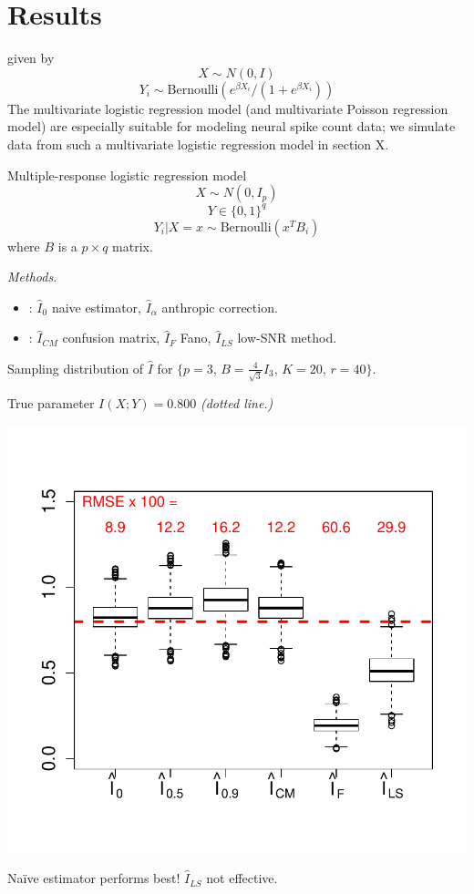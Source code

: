 \documentclass{article}
\begin{document}
\section{Results}

given by
\[
X \sim N(0, I)
\]
\[
Y_i \sim \text{Bernoulli}(e^{\beta X_i}/(1 + e^{\beta X_i}))
\]
The multivariate logistic regression model (and multivariate Poisson regression model)
are especially suitable for modeling neural spike count data;
we simulate data from such a multivariate logistic regression model in section X.


Multiple-response logistic regression model
\[
X \sim N(0, I_p)
\]
\[
Y \in \{0,1\}^q
\]
\[
Y_i|X = x \sim \text{Bernoulli}(x^T B_i)
\]
where $B$ is a $p \times q$ matrix.

\emph{Methods.}
\begin{itemize}
\item {}: $\hat{I}_0$ naive estimator, $\hat{I}_\alpha$ anthropic correction.
\item {}: $\hat{I}_{CM}$ confusion matrix, $\hat{I}_F$ Fano, $\hat{I}_{LS}$ low-SNR method.
\end{itemize}

Sampling distribution of $\hat{I}$ for \small{$\{p = 3$, $B = \frac{4}{\sqrt{3}} I_3$, $K = 20$, $r = 40\}$.}

True parameter $I(X; Y) = 0.800$ \emph{(dotted line.)}
\begin{center}
\includegraphics[scale = 0.5, clip = true, trim = 0 0.5in 0 0.5in]{../info_theory_sims/fig1.pdf}
\end{center}
Na\"{i}ve estimator performs best!  $\hat{I}_{LS}$ not effective.
\end{document}

